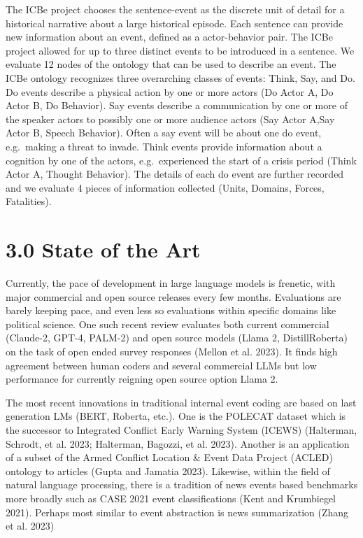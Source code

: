 \documentclass[
  letterpaper,
  DIV=11,
  numbers=noendperiod]{scrartcl}
\begin{document}
The ICBe project chooses the sentence-event as the discrete unit of
detail for a historical narrative about a large historical episode. Each
sentence can provide new information about an event, defined as a
actor-behavior pair. The ICBe project allowed for up to three distinct
events to be introduced in a sentence. We evaluate 12 nodes of the
ontology that can be used to describe an event. The ICBe ontology
recognizes three overarching classes of events: Think, Say, and Do. Do
events describe a physical action by one or more actors (Do Actor A, Do
Actor B, Do Behavior). Say events describe a communication by one or
more of the speaker actors to possibly one or more audience actors (Say
Actor A,Say Actor B, Speech Behavior). Often a say event will be about
one do event, e.g.~making a threat to invade. Think events provide
information about a cognition by one of the actors, e.g.~experienced the
start of a crisis period (Think Actor A, Thought Behavior). The details
of each do event are further recorded and we evaluate 4 pieces of
information collected (Units, Domains, Forces, Fatalities).

\hypertarget{state-of-the-art}{%
\section{3.0 State of the Art}\label{state-of-the-art}}

Currently, the pace of development in large language models is frenetic,
with major commercial and open source releases every few months.
Evaluations are barely keeping pace, and even less so evaluations within
specific domains like political science. One such recent review
evaluates both current commercial (Claude-2, GPT-4, PALM-2) and open
source models (Llama 2, DistillRoberta) on the task of open ended survey
responses (Mellon et al. 2023). It finds high agreement between human
coders and several commercial LLMs but low performance for currently
reigning open source option Llama 2.

The most recent innovations in traditional internal event coding are
based on last generation LMs (BERT, Roberta, etc.). One is the POLECAT
dataset which is the successor to Integrated Conflict Early Warning
System (ICEWS) (Halterman, Schrodt, et al. 2023; Halterman, Bagozzi, et
al. 2023). Another is an application of a subset of the Armed Conflict
Location \& Event Data Project (ACLED) ontology to articles (Gupta and
Jamatia 2023). Likewise, within the field of natural language
processing, there is a tradition of news events based benchmarks more
broadly such as CASE 2021 event classifications (Kent and Krumbiegel
2021). Perhaps most similar to event abstraction is news summarization
(Zhang et al. 2023)
\end{document}
